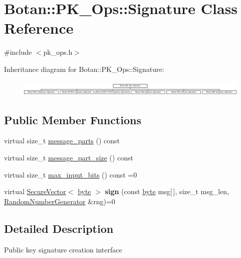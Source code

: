 \hypertarget{classBotan_1_1PK__Ops_1_1Signature}{\section{Botan\-:\-:P\-K\-\_\-\-Ops\-:\-:Signature Class Reference}
\label{classBotan_1_1PK__Ops_1_1Signature}
}


{\ttfamily \#include $<$pk\-\_\-ops.\-h$>$}

Inheritance diagram for Botan\-:\-:P\-K\-\_\-\-Ops\-:\-:Signature\-:\begin{figure}[H]
\begin{center}
\leavevmode
\includegraphics[height=0.743692cm]{classBotan_1_1PK__Ops_1_1Signature}
\end{center}
\end{figure}
\subsection*{Public Member Functions}
\begin{DoxyCompactItemize}
\item 
virtual size\-\_\-t \hyperlink{classBotan_1_1PK__Ops_1_1Signature_a0796a0e53462052c38c5cf961d272327}{message\-\_\-parts} () const 
\item 
virtual size\-\_\-t \hyperlink{classBotan_1_1PK__Ops_1_1Signature_ae83efb440f1bda16398e0b9cbf2ef1f4}{message\-\_\-part\-\_\-size} () const 
\item 
virtual size\-\_\-t \hyperlink{classBotan_1_1PK__Ops_1_1Signature_ada6cef38a91e75e9f9048867d89d5e07}{max\-\_\-input\-\_\-bits} () const =0
\item 
\hypertarget{classBotan_1_1PK__Ops_1_1Signature_a3e1cd7e7520561f03874b433ed978b70}{virtual \hyperlink{classBotan_1_1SecureVector}{Secure\-Vector}$<$ \hyperlink{namespaceBotan_a7d793989d801281df48c6b19616b8b84}{byte} $>$ {\bfseries sign} (const \hyperlink{namespaceBotan_a7d793989d801281df48c6b19616b8b84}{byte} msg\mbox{[}$\,$\mbox{]}, size\-\_\-t msg\-\_\-len, \hyperlink{classBotan_1_1RandomNumberGenerator}{Random\-Number\-Generator} \&rng)=0}\label{classBotan_1_1PK__Ops_1_1Signature_a3e1cd7e7520561f03874b433ed978b70}

\end{DoxyCompactItemize}


\subsection{Detailed Description}
Public key signature creation interface 

